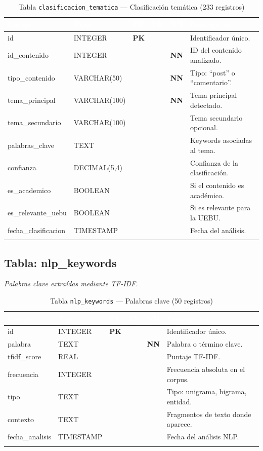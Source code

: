 \documentclass[11pt,a4paper]{article}
\newcommand{\tableheadrow}{\rowcolor{tableheader}}
\newcommand{\tablehead}[1]{\textcolor{white}{\textbf{#1}}}
\newcommand{\pk}{\textcolor{emiblue}{\textbf{PK}}}
\newcommand{\nn}{\textcolor{red!70!black}{\textbf{NN}}}
\begin{document}
\begin{longtable}{p{4.2cm} p{2.8cm} c c c p{4.5cm}}
\toprule
\tableheadrow
\tablehead{Campo} & \tablehead{Tipo} & \tablehead{PK} & \tablehead{FK} & \tablehead{NN} & \tablehead{Descripción} \\
\midrule
\endhead
id & INTEGER & \pk & & & Identificador único. \\
\rowcolor{tablerow}
id\_contenido & INTEGER & & & \nn & ID del contenido analizado. \\
tipo\_contenido & VARCHAR(50) & & & \nn & Tipo: ``post'' o ``comentario''. \\
\rowcolor{tablerow}
tema\_principal & VARCHAR(100) & & & \nn & Tema principal detectado. \\
tema\_secundario & VARCHAR(100) & & & & Tema secundario opcional. \\
\rowcolor{tablerow}
palabras\_clave & TEXT & & & & Keywords asociadas al tema. \\
confianza & DECIMAL(5,4) & & & & Confianza de la clasificación. \\
\rowcolor{tablerow}
es\_academico & BOOLEAN & & & & Si el contenido es académico. \\
es\_relevante\_uebu & BOOLEAN & & & & Si es relevante para la UEBU. \\
\rowcolor{tablerow}
fecha\_clasificacion & TIMESTAMP & & & & Fecha del análisis. \\
\bottomrule
\caption{Tabla \texttt{clasificacion\_tematica} — Clasificación temática (233 registros)}
\end{longtable}

\subsection{Tabla: nlp\_keywords}
\textit{Palabras clave extraídas mediante TF-IDF.}

\begin{longtable}{p{4.2cm} p{2.8cm} c c c p{4.5cm}}
\toprule
\tableheadrow
\tablehead{Campo} & \tablehead{Tipo} & \tablehead{PK} & \tablehead{FK} & \tablehead{NN} & \tablehead{Descripción} \\
\midrule
\endhead
id & INTEGER & \pk & & & Identificador único. \\
\rowcolor{tablerow}
palabra & TEXT & & & \nn & Palabra o término clave. \\
tfidf\_score & REAL & & & & Puntaje TF-IDF. \\
\rowcolor{tablerow}
frecuencia & INTEGER & & & & Frecuencia absoluta en el corpus. \\
tipo & TEXT & & & & Tipo: unigrama, bigrama, entidad. \\
\rowcolor{tablerow}
contexto & TEXT & & & & Fragmentos de texto donde aparece. \\
fecha\_analisis & TIMESTAMP & & & & Fecha del análisis NLP. \\
\bottomrule
\caption{Tabla \texttt{nlp\_keywords} — Palabras clave (50 registros)}
\end{longtable}
\end{document}
